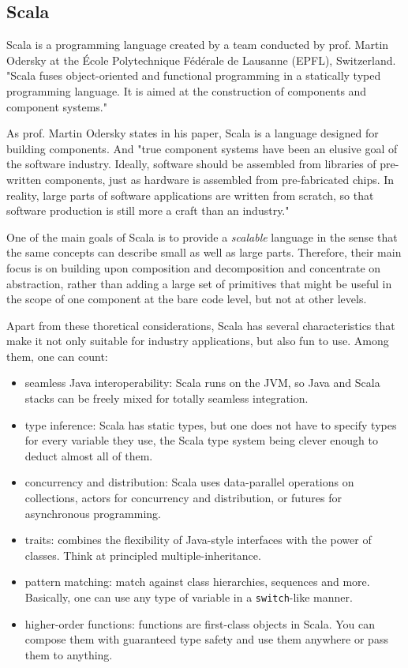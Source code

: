 
\subsection{Scala}
\label{sub-sec:scala}

Scala is a programming language created by a team conducted by prof. Martin
Odersky at the \'Ecole Polytechnique F\'ed\'erale de Lausanne (EPFL), Switzerland.
"Scala fuses object-oriented and functional programming in a statically typed
programming language. It is aimed at the construction of components and
component systems."\cite{scala}

As prof. Martin Odersky states in his paper, Scala is a language designed for
building components. And "true component systems have been an elusive goal
of the software industry.
Ideally, software should be assembled from libraries of pre-written
components, just as hardware is assembled from pre-fabricated chips. In
reality, large parts of software applications are written from scratch, so
that software production is still more a craft than an industry."

One of the main goals of Scala is to provide a \textit{scalable} language in
the sense that the same concepts can describe small as well as large parts.
Therefore, their main focus is on building upon composition and decomposition
and concentrate on abstraction, rather than adding a large set of primitives
that might be useful in the scope of one component at the bare code level, but
not at other levels.

Apart from these thoretical considerations, Scala has several characteristics
that make it not only suitable for industry applications, but also fun to use.
Among them, one can count:
\begin{itemize}
  \item seamless Java interoperability: Scala runs on the JVM, so Java and Scala
  stacks can be freely mixed for totally seamless integration.
  \item type inference: Scala has static types, but one does not have to
  specify types for every variable they use, the Scala type system being
  clever enough to deduct almost all of them.
  \item concurrency and distribution: Scala uses data-parallel operations on
  collections, actors for concurrency and distribution, or futures for
  asynchronous programming.
  \item traits: combines the flexibility of Java-style interfaces with the
  power of classes. Think at principled multiple-inheritance.
  \item pattern matching: match against class hierarchies, sequences and more.
  Basically, one can use any type of variable in a \texttt{switch}-like
  manner.
  \item higher-order functions: functions are first-class objects in Scala.
  You can compose them with guaranteed type safety and use them anywhere or pass
  them to anything.
\end{itemize}

